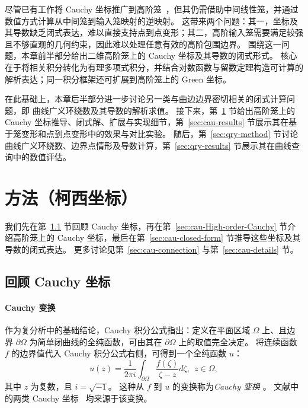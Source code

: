 尽管已有工作将 Cauchy 坐标推广到高阶笼~\cite{Lin2024PolynomialCC}，但其仍需借助中间线性笼，并通过数值方式计算从中间笼到输入笼映射的逆映射。
这带来两个问题：其一，坐标及其导数缺乏闭式表达，难以直接支持点到点变形；其二，高阶输入笼需要满足较强且不够直观的几何约束，因此难以处理任意有效的高阶包围边界。
围绕这一问题，本章前半部分给出二维高阶笼上的 Cauchy 坐标及其导数的闭式形式。
核心在于将相关积分转化为有理多项式积分，并结合对数函数与留数定理构造可计算的解析表达；同一积分框架还可扩展到高阶笼上的 Green 坐标。

在此基础上，本章后半部分进一步讨论另一类与曲边边界密切相关的闭式计算问题，即 \Bezier 曲线广义环绕数及其导数的解析求值。
接下来，第~\ref{sec:cau-method} 节给出高阶笼上的 Cauchy 坐标推导、闭式解、扩展与实现细节，第~\ref{sec:cau-results} 节展示其在基于笼变形和点到点变形中的效果与对比实验。
随后，第~\ref{sec:qry-method} 节讨论 \Bezier 曲线广义环绕数、边界点情形及导数计算，第~\ref{sec:qry-results} 节展示其在曲线查询中的数值评估。

\section{方法（柯西坐标）} \label{sec:cau-method}
我们先在第~\ref{sec:cau-revisit} 节回顾 Cauchy 坐标，再在第~\ref{sec:cau-High-order-Cauchy} 节介绍高阶笼上的 Cauchy 坐标，最后在第~\ref{sec:cau-closed-form} 节推导这些坐标及其导数的闭式表达。
%
更多讨论见第~\ref{sec:cau-connection} 与第~\ref{sec:cau-details} 节。

\subsection{回顾 Cauchy 坐标}\label{sec:cau-revisit}
\paragraph{Cauchy 变换}
作为复分析中的基础结论，Cauchy 积分公式指出：定义在平面区域 \(\Omega\) 上、且边界 $\partial \Omega$ 为简单闭曲线的全纯函数，可由其在 $\partial \Omega$ 上的取值完全决定。
%
将连续函数 \(f\) 的边界值代入 Cauchy 积分公式右侧，可得到一个全纯函数 \(u\)：
\begin{equation}\label{equ:cau-Cauchy-integral}
    u(z)=\frac{1}{2\pi i}\int_{\partial \Omega}\frac{f(\zeta)}{\zeta-z} d\zeta,\ \ z \in \Omega,
\end{equation}
其中 $z$ 为复数，且 \(i=\sqrt{-1}\)。
这种从 \(f\) 到 \(u\) 的变换称为\emph{Cauchy 变换} \cite{Bell2015cauchytransform}。
文献中的两类 Cauchy 坐标~\cite{Weber2009,Lin2024PolynomialCC} 均来源于该变换。

